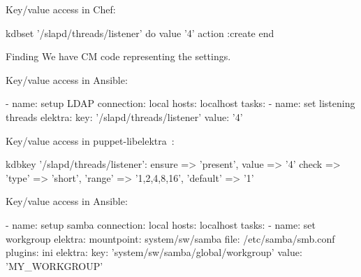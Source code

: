 \begin{frame}[fragile]
	Key/value access in Chef:
	\vspace{0.5cm}

	\begin{code}[morekeywords={kdbset,do,action,value,end},gobble=4]
	kdbset '/slapd/threads/listener' do
		value '4'
		action :create
	end
	\end{code}

	\pause
	\begin{alertblock}{Finding}
	We have CM code representing the settings.
	\end{alertblock}
\end{frame}

\begin{frame}[fragile]
	Key/value access in Ansible:
	\vspace{0.5cm}

	\begin{code}[morekeywords={name,connection,key,value,elektra,mountpoint,file,plugins,hosts,tasks},gobble=4]
	- name: setup LDAP
	  connection: local
	  hosts: localhost
	  tasks:
	  - name: set listening threads
	    elektra:
	      key: '/slapd/threads/listener'
	      value: '4'
	\end{code}
\end{frame}

\begin{frame}[fragile]
	Key/value access in puppet-libelektra~\cite{raab2020unified}:
	\vspace{0.5cm}

	\begin{code}[morekeywords={kdbkey,kdbmount,ensure,value},gobble=4]
	kdbkey {'/slapd/threads/listener':
		ensure => 'present',
		value => '4'
		check => {
			'type' => 'short',
			'range' => '1,2,4,8,16',
			'default' => '1'
		}
	}
	\end{code}
\end{frame}


\begin{frame}[fragile]
	Key/value access in Ansible:

	\begin{code}[morekeywords={name,connection,key,value,elektra,mountpoint,file,plugins,hosts,tasks},gobble=4]
	- name: setup samba
	  connection: local
	  hosts: localhost
	  tasks:
	  - name: set workgroup
	    elektra:
	      mountpoint: system/sw/samba
	      file: /etc/samba/smb.conf
	      plugins: ini
	    elektra:
	      key: 'system/sw/samba/global/workgroup'
	      value: 'MY_WORKGROUP'
	\end{code}
\end{frame}

